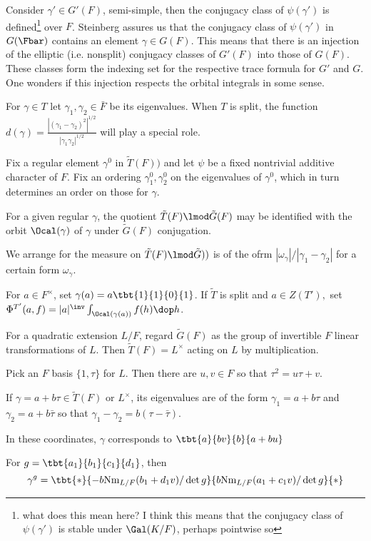 Consider $\gamma' \in G'(F)$, semi-simple, then the conjugacy class of $\psi(\gamma')$ is defined\footnote{what does this mean here? I think this means that the conjugacy class of $\psi(\gamma')$ is stable under $\Gal(K/F)$, perhaps pointwise so}  over $F$. Steinberg assures us that the conjugacy class of $\psi(\gamma')$ in $G(\Fbar)$ contains an element $\gamma \in G(F)$. This means that there is an injection of the elliptic (i.e. nonsplit) conjugacy classes of $G'(F)$ into those of $G(F)$. These classes form the indexing set for the respective trace formula for $G'$ and $G$. One wonders if this injection respects the orbital integrals in some sense.

For $\gamma \in T$ let $\gamma_1,\gamma_2 \in \bar{F}$ be its eigenvalues. When $T$ is split, the function $d(\gamma)= \frac{|(\gamma_1 -\gamma_2)^2|^{1/2}}{|\gamma_1\gamma_2|^{1/2}} $ will play a special role.

Fix a regular element $\gamma^0$ in $\tilde{T}(F))$ and let $\psi$ be a fixed nontrivial additive character of $F$. Fix an ordering $\gamma_1^0, \gamma_2^0$ on the eigenvalues of $\gamma^0$, which in turn determines an order on those for $\gamma$.

For a given regular $\gamma$, the quotient $\tilde{T}(F) \lmod \tilde{G}(F)$ may be identified with the orbit $\Ocal(\gamma)$ of $\gamma$ under $\tilde{G}(F)$ conjugation.

We arrange for the measure on $\tilde{T}(F)\lmod \tilde{G}))$ is of the ofrm $|\omega_\gamma |/|\gamma_1 - \gamma_2|$ for a certain form $\omega_\gamma$.

For $a\in F^\times$, set $\gamma(a) = a\tbt{1}{1}{0}{1}$. If $\tilde{T}$ is split and $a\in Z(T'),$ set $\Phi^{T'}(a,f)= |a|^\inv \int_{\Ocal(\gamma(a))} f(h) \dop h$.

For a quadratic extension $L/F$, regard $\tilde{G}(F)$ as the group of invertible $F$ linear transformations of  $L$. Then $\tilde{T}(F)= L^\times$ acting on $L$ by multiplication.

Pick an $F$ basis $\{1,\tau\}$ for $L$. Then there are $u,v \in F$ so that $\tau^2 = u \tau +v$.

If $\gamma = a+b\tau \in \tilde{T}(F)$ or $L^\times$, its eigenvalues are of the form $\gamma_1=a+b\tau$ and $\gamma_2 = a+b \bar{\tau}$ so that $\gamma_1-\gamma_2  = b (\tau -\bar{\tau})$.

In these coordinates, $\gamma$ corresponds to $\tbt{a}{bv}{b}{a+bu} $

For $g = \tbt{a_1}{b_1}{c_1}{d_1}$, then
$$\gamma^g = \tbt{*}{-b \Nm{L/F}(b_1+d_1v)/\det g}{b \Nm{L/F}(a_1+c_1v)/\det g}{*}$$

